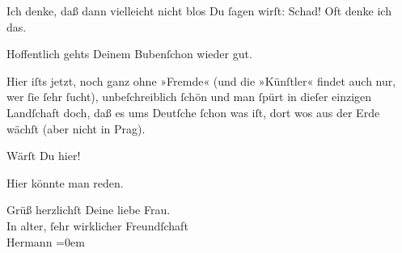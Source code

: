 \pstart
           Ich denke, daß dann vielleicht nicht blos Du{ }ſagen wirſt: \label{LL319-1v}Schad!\label{LL319-1h} Oft denke ich das.\pend
           
\pstart
           Hoffentlich gehts Deinem Bubenſchon wieder gut.\pend
           
\pstart
           Hier iſts jetzt, noch ganz ohne »Fremde« (und die »Künſtler« findet auch nur, wer{ }ſie{ }ſehr{ }ſucht), unbeſchreiblich{ }ſchön und man{ }ſpürt in dieſer einzigen Landſchaft doch,
               daß es ums Deutſche{ }ſchon was iſt, dort wos aus der Erde wächſt (aber nicht in Prag).\pend
           
\pstart
           Wärſt Du hier!\pend
           
\pstart
           Hier könnte man reden.\pend
           
\pstart
           Grüß herzlichſt Deine liebe Frau.{\\[\baselineskip]}In alter,{ }ſehr wirklicher Freundſchaft{\\[\baselineskip]}\spacefill\mbox{Hermann}\pend
           \leftskip=0em{}\endnumbering{}  \newcommand{\dateiname}{L01851}\newcommand{\titel}{Hermann Bahr an Arthur Schnitzler, 28. 6. 1909}\newcommand{\editorInnen}{Herausgegeben von Martin Anton Müller}
